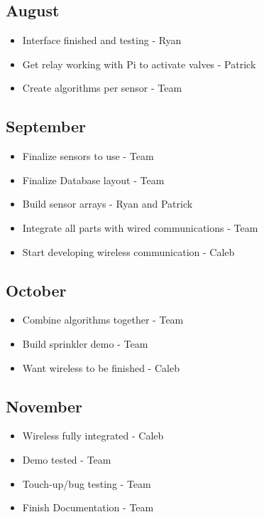 \documentclass[letterpaper, 10 pt, conference]{ieeeconf}  %
\begin{document}
\subsection{August}
\begin{itemize}
    \item Interface finished and testing - Ryan
    \item Get relay working with Pi to activate valves - Patrick
    \item Create algorithms per sensor - Team
\end{itemize}

\subsection{September}
\begin{itemize}
    \item Finalize sensors to use - Team
    \item Finalize Database layout - Team
    \item Build sensor arrays - Ryan and Patrick
    \item Integrate all parts with wired communications - Team
    \item Start developing wireless communication - Caleb
\end{itemize}

\subsection{October}
\begin{itemize}
    \item Combine algorithms together - Team
    \item Build sprinkler demo - Team
    \item Want wireless to be finished - Caleb
\end{itemize}

\subsection{November}
\begin{itemize}
    \item Wireless fully integrated - Caleb
    \item Demo tested - Team
    \item Touch-up/bug testing - Team
    \item Finish Documentation - Team
\end{itemize}
\end{document}
